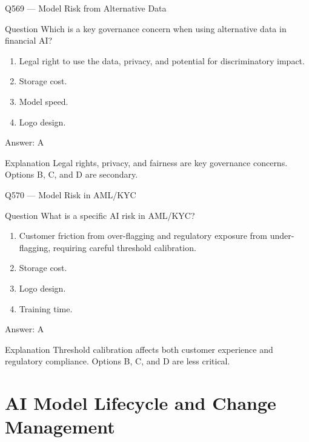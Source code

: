 \documentclass[aspectratio=169,8pt]{beamer}
\begin{document}
	\begin{frame}{Q569 --- Model Risk from Alternative Data}
		\begin{block}{Question}
			Which is a key governance concern when using alternative data in financial AI?
			\begin{enumerate}
				\item Legal right to use the data, privacy, and potential for discriminatory impact.
				\item Storage cost.
				\item Model speed.
				\item Logo design.
			\end{enumerate}
		\end{block}
		\begin{exampleblock}{Answer: A}\end{exampleblock}
		\begin{block}{Explanation}
			Legal rights, privacy, and fairness are key governance concerns. Options B, C, and D are secondary.
		\end{block}
	\end{frame}
	
	\begin{frame}{Q570 --- Model Risk in AML/KYC}
		\begin{block}{Question}
			What is a specific AI risk in AML/KYC?
			\begin{enumerate}
				\item Customer friction from over-flagging and regulatory exposure from under-flagging, requiring careful threshold calibration.
				\item Storage cost.
				\item Logo design.
				\item Training time.
			\end{enumerate}
		\end{block}
		\begin{exampleblock}{Answer: A}\end{exampleblock}
		\begin{block}{Explanation}
			Threshold calibration affects both customer experience and regulatory compliance. Options B, C, and D are less critical.
		\end{block}
	\end{frame}
	
	\section{AI Model Lifecycle and Change Management}
	
\end{document}
